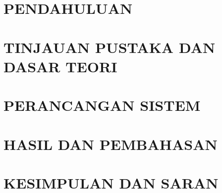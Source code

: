 \documentclass[english]{jtetiskripsi}
\begin{document}


\cover

\approvalpage

\preface


\tableofcontents
{}
\listoftables
{}
\listoffigures
{}

%




\chapter{PENDAHULUAN}


\chapter{TINJAUAN PUSTAKA DAN DASAR TEORI}


\chapter{PERANCANGAN SISTEM}


\chapter{HASIL DAN  PEMBAHASAN}


\chapter{KESIMPULAN DAN SARAN}


\clearpage
{}

\end{document}
